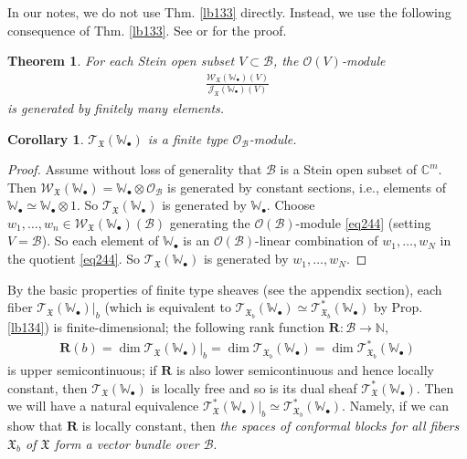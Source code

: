 \documentclass[12pt,a4paper,notitlepage]{article}
\theoremstyle{definition}
\theoremstyle{plain}
\newtheorem{thm}[df]{Theorem}
\newtheorem{co}[df]{Corollary}
\newcommand{\fk}{\mathfrak}
\newcommand{\mc}{\mathcal}
\newcommand{\scr}{\mathscr}
\newcommand{\blt}{\bullet}
\newcommand{\Wbb}{\mathbb W}
\newcommand{\Cbb}{\mathbb C}
\newcommand{\Nbb}{\mathbb N}
\newcommand{\Rbf}{\mathbf R}
\numberwithin{equation}{section}
\begin{document}
In our notes, we do not use Thm. \ref{lb133} directly. Instead, we use the following consequence of Thm. \ref{lb133}. See \cite[Sec. 7]{Gui20} or \cite[Sec. 3.7]{Gui} for the proof.

\begin{thm}\label{lb138}
For each Stein open subset $V\subset\mc B$, the $\scr O(V)$-module
\begin{align}
\frac{\scr W_{\fk X}(\Wbb_\blt)(V)}{\scr J_{\fk X}(\Wbb_\blt)(V)}\label{eq244}
\end{align}
is generated by finitely many elements.
\end{thm}

\begin{co}
$\scr T_{\fk X}(\Wbb_\blt)$ is a finite type $\scr O_{\mc B}$-module.
\end{co}

\begin{proof}
Assume without loss of generality that $\mc B$ is a Stein open subset of $\Cbb^m$. Then $\scr W_{\fk X}(\Wbb_\blt)=\Wbb_\blt\otimes\scr O_{\mc B}$ is generated by constant sections, i.e., elements of $\Wbb_\blt\simeq\Wbb_\blt\otimes 1$. So $\scr T_{\fk X}(\Wbb_\blt)$ is generated by $\Wbb_\blt$. Choose $w_1,\dots,w_n\in \scr W_{\fk X}(\Wbb_\blt)(\mc B)$ generating the $\scr O({\mc B})$-module \eqref{eq244} (setting $V=\mc B$). So each element of $\Wbb_\blt$ is an $\scr O(\mc B)$-linear combination of $w_1,\dots,w_N$ in the quotient \eqref{eq244}. So $\scr T_{\fk X}(\Wbb_\blt)$ is generated by $w_1,\dots,w_N$.
\end{proof}


By the basic properties of finite type sheaves (see the appendix section), each fiber $\scr T_{\fk X}(\Wbb_\blt)|_b$ (which is equivalent to $\scr T_{\fk X_b}(\Wbb_\blt)\simeq\scr T_{\fk X_b}^*(\Wbb_\blt)$ by Prop. \ref{lb134}) is finite-dimensional; the following rank function $\Rbf:\mc B\rightarrow\Nbb$,
\begin{align}
\Rbf(b)=\dim \scr T_{\fk X}(\Wbb_\blt)|_b=\dim\scr T_{\fk X_b}(\Wbb_\blt)=\dim\scr T_{\fk X_b}^*(\Wbb_\blt) \label{eq246}
\end{align}
is upper semicontinuous; if $\Rbf$ is also lower semicontinuous and hence locally constant, then $\scr T_{\fk X}(\Wbb_\blt)$ is locally free and so is its dual sheaf $\scr T_{\fk X}^*(\Wbb_\blt)$. Then we will have a natural equivalence $\scr T_{\fk X}^*(\Wbb_\blt)|_b\simeq\scr T_{\fk X_b}^*(\Wbb_\blt)$. Namely, if we can show that $\Rbf$ is locally constant, then \emph{the spaces of conformal blocks for all fibers $\fk X_b$ of $\fk X$ form a vector bundle over $\mc B$}.
\end{document}
